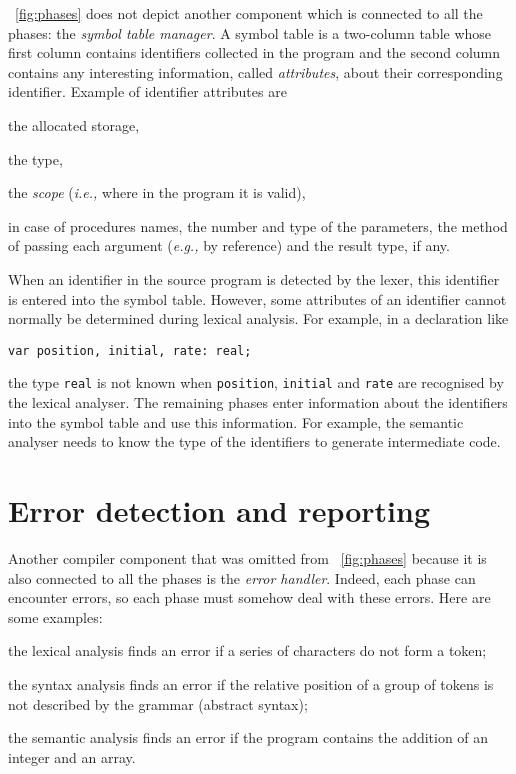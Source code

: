 \Fig~\vref{fig:phases} does not depict another component which is
connected to all the phases: the \emph{symbol table manager}. A symbol
table is a two\hyp{}column table whose first column contains
identifiers collected in the program and the second column contains
any interesting information, called \emph{attributes}, about their
corresponding identifier. Example of identifier attributes are
\begin{itemize*}
  \item the allocated storage,

  \item the type, 

  \item the \emph{scope} (\emph{i.e.,} where in the program it is
    valid),

  \item in case of procedures names, the number and type of the
    parameters, the method of passing each argument (\emph{e.g.,} by
    reference) and the result type, if any.

\end{itemize*}
When an identifier in the source program is detected by the lexer,
this identifier is entered into the symbol table. However, some
attributes of an identifier cannot normally be determined during
lexical analysis. For example, in a \Pascal declaration like
\begin{verbatim}
var position, initial, rate: real;
\end{verbatim}
the type \texttt{real} is not known when \texttt{position},
\texttt{initial} and \texttt{rate} are recognised by the lexical
analyser. The remaining phases enter information about the identifiers
into the symbol table and use this information. For example, the
semantic analyser needs to know the type of the identifiers to
generate intermediate code.

\section*{Error detection and reporting}

Another compiler component that was omitted
from \fig~\vref{fig:phases} because it is also connected to all the
phases is the \emph{error handler}. Indeed, each phase can encounter
errors, so each phase must somehow deal with these errors. Here are
some examples:
\begin{itemize*}

  \item the lexical analysis finds an error if a series of characters
  do not form a token;

  \item the syntax analysis finds an error if the relative position of
  a group of tokens is not described by the grammar (abstract syntax);

  \item the semantic analysis finds an error if the program contains
  the addition of an integer and an array.

\end{itemize*}

